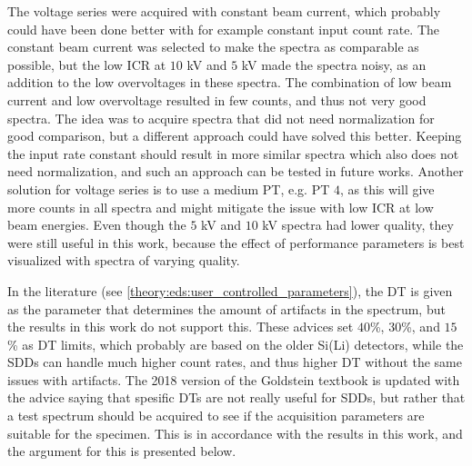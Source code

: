 The voltage series were acquired with constant beam current, which probably could have been done better with for example constant input count rate.
The constant beam current was selected to make the spectra as comparable as possible, but the low ICR at $10$ kV and $5$ kV made the spectra noisy, as an addition to the low overvoltages in these spectra.
The combination of low beam current and low overvoltage resulted in few counts, and thus not very good spectra.
The idea was to acquire spectra that did not need normalization for good comparison, but a different approach could have solved this better.
Keeping the input rate constant should result in more similar spectra which also does not need normalization, and such an approach can be tested in future works.
Another solution for voltage series is to use a medium PT, e.g. PT $4$, as this will give more counts in all spectra and might mitigate the issue with low ICR at low beam energies.
Even though the $5$ kV and $10$ kV spectra had lower quality, they were still useful in this work, because the effect of performance parameters is best visualized with spectra of varying quality.


In the literature \cite{astm_e1508_eds_quantification,iso_quantification_22309,newbury_deadtime_2014} (see \cref{theory:eds:user_controlled_parameters}), the DT is given as the parameter that determines the amount of artifacts in the spectrum, but the results in this work do not support this.
These advices set $40$\%, $30$\%, and $15$\% as DT limits, which probably are based on the older Si(Li) detectors, while the SDDs can handle much higher count rates, and thus higher DT without the same issues with artifacts.
The 2018 version of the Goldstein textbook \cite{goldstein_scanning_2018} is updated with the advice saying that spesific DTs are not really useful for SDDs, but rather that a test spectrum should be acquired to see if the acquisition parameters are suitable for the specimen.
This is in accordance with the results in this work, and the argument for this is presented below. 

